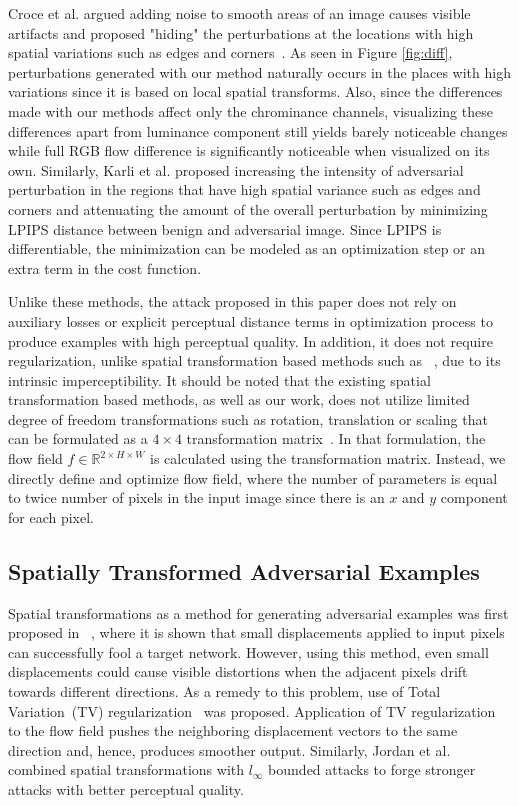 Croce et al. argued adding noise to smooth areas of an image causes visible artifacts and proposed "hiding" the perturbations at the locations with high spatial variations such as edges and corners~\cite{croce2019sparse}. As seen in Figure \ref{fig:diff}, perturbations generated with our method naturally occurs in the places with high variations since it is based on local spatial transforms. Also, since the differences made with our methods affect only the chrominance channels, visualizing these differences apart from luminance component still yields barely noticeable changes while full RGB flow difference is significantly noticeable when visualized on its own. Similarly, Karli et al. proposed increasing the intensity of adversarial perturbation in the regions that have high spatial variance such as edges and corners and attenuating the amount of the overall perturbation by minimizing LPIPS distance between benign and adversarial image. Since LPIPS is differentiable, the minimization can be modeled as an optimization step or an extra term in the cost function.

Unlike these methods, the attack proposed in this paper does not rely on auxiliary losses or explicit perceptual distance terms in optimization process to produce examples with high perceptual quality. In addition, it does not require regularization, unlike spatial transformation based methods such as ~\cite{xiao2018spatially}, due to its intrinsic imperceptibility. It should be noted that the existing spatial transformation based methods, as well as our work, does not utilize limited degree of freedom transformations such as rotation, translation or scaling that can be formulated as a \(4\times4\) transformation matrix~\cite{jaderberg2015spatial}. In that formulation, the flow field \(f \in \mathbb{R}^{2\times H \times W}\) is calculated using the transformation matrix. Instead, we directly define and optimize flow field, where the number of parameters is equal to twice number of pixels in the input image since there is an \(x\) and \(y\) component for each pixel.

\subsection{Spatially Transformed Adversarial Examples}

Spatial transformations as a method for generating adversarial examples was first proposed in ~\cite{xiao2018spatially}, where it is shown that small displacements applied to input pixels can successfully fool a target network. However, using this method, even small displacements could cause visible distortions when the adjacent pixels drift towards different directions. As a remedy to this problem, use of Total Variation~(TV) regularization~\cite{estrela2016total} was proposed. Application of TV regularization to the flow field pushes the neighboring displacement vectors to the same direction and, hence, produces smoother output. Similarly, Jordan et al.~\cite{jordan2019quantifying} combined spatial transformations with \(l_\infty\) bounded attacks to forge stronger attacks with better perceptual quality.

